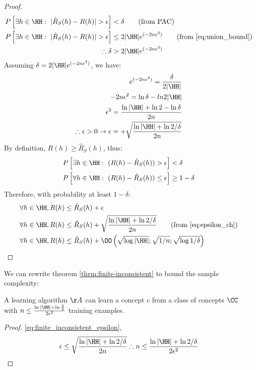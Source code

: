 \begin{proof}
	\begin{align}
		P\left[ \exists h \in \HH:~|\hat{R}_{S}(h) - R(h)| >\epsilon\right] &< \delta \tag{from PAC}\\
		P\left[ \exists h \in \HH:~|\hat{R}_{S}(h) - R(h)| >\epsilon\right] &\leq 2 |\HH| e^{(-2n\epsilon^2)} \tag{from \eqref{eq:union_bound}}\\
		\therefore \delta &> 2 |\HH| e^{(-2n\epsilon^2)}
	\end{align}
	Assuming \(\delta = 2 |\HH| e^{(-2n\epsilon^2)}\), we have:
	\begin{align}
		e^{(-2n\epsilon^2)} = \frac{\delta}{2|\HH|} \\
		-2n\epsilon^2 = \ln{\delta} - ln{2|\HH|}\\
		\epsilon^2 = \frac{\ln{|\HH|}+\ln{2}-\ln{\delta}}{2n}\\
		\therefore \epsilon > 0 \rightarrow \epsilon = + \sqrt{\frac{\ln{|\HH|}+ \ln{2/\delta}}{2n}}\label{eq:epsilon_ch}
	\end{align}
	By definition, \(R(h)\geq \hat{R}_{S}(h)\), thus:
	\begin{align}
		P\left[ \exists h \in \HH:~(R(h) - \hat{R}_{S}(h)) >\epsilon\right] &< \delta \\
		P\left[ \forall h \in \HH:~(R(h) - \hat{R}_{S}(h)) \leq \epsilon\right] &\geq 1 - \delta
	\end{align}
	Therefore, with probability at least \(1-\delta\):
	\begin{align}
		\forall h \in \HH, R(h)&\leq \hat{R}_{S}(h) + \epsilon \\
		\forall h \in \HH, R(h)&\leq \hat{R}_{S}(h) + \sqrt{\frac{\ln{|\HH|}+ \ln{2/\delta}}{2n}}\label{eq:finite_inconsistent_epsilon}\tag{from \eqref{eq:epsilon_ch}}\\
		\forall h \in \HH, R(h)&\leq \hat{R}_{S}(h) + \OO \left(\sqrt{ \log |\HH| }; \sqrt{1/n}; \sqrt{ \log 1/\delta} \right)
	\end{align}
\end{proof}
We can rewrite theorem \ref{thrm:finite-inconsistent} to bound the sample complexity:
\begin{theorem}
	A learning algorithm \(\AA\) can learn a concept \(c\) from a class of concepts \(\CC\) with \(n \leq \frac{\ln{|\HH|}+\ln{\frac{2}{\delta}}}{2\epsilon^2}\) training examples.
\end{theorem}
\begin{proof} \ref{eq:finite_inconsistent_epsilon},
	\begin{align}
		\epsilon \leq \sqrt{\frac{\ln{|\HH|}+ \ln{2/\delta}}{2n}}
		\therefore n \leq \frac{\ln{|\HH|}+ \ln{2/\delta}}{2\epsilon^2}
	\end{align}
\end{proof}


